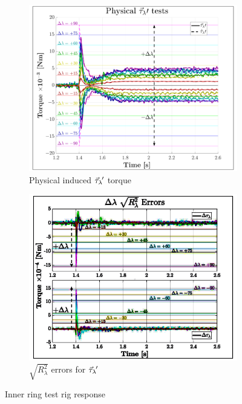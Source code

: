 \par
\begin{figure}[hbtp]
\vspace{-10pt}
\centering
\begin{subfigure}{0.495\textwidth}
\centering
\includegraphics[width=\textwidth]{graphs/tau-lambda}
\caption{Physical induced $\vec{\tau}_\lambda\hspace{-1pt}'$ torque}
\label{fig:tau-lambda}
\end{subfigure}
\begin{subfigure}{0.495\textwidth}
\centering
\includegraphics[width=\textwidth]{graphs/tau-lambda-r}
\caption{$\sqrt{R^2_{\lambda}}$ errors for $\vec{\tau}_\lambda\hspace{-1pt}'$}
\label{fig:tau-lambda-r}
\end{subfigure}
\vspace{-4pt}
\caption{Inner ring test rig response}
\label{fig:inner-ring-response-test}
\vspace{-10pt}
\end{figure}
